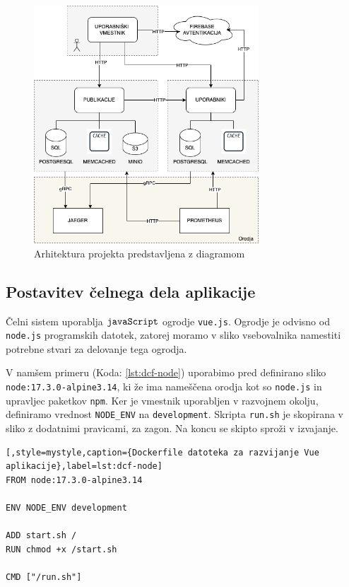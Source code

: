 \documentclass[a4paper, 12pt]{book}
\begin{document}
\begin{figure}[h]
\begin{center}
\includegraphics[width=0.75\textwidth]{slike/arch-done.png}
\end{center}
\caption{ Arhitektura projekta predstavljena z diagramom }
\label{final-arch}
\end{figure}

\subsection{Postavitev čelnega dela aplikacije}
Čelni sistem uporablja $\verb=javaScript=$ ogrodje \verb=vue.js=. Ogrodje je odvisno od \verb=node.js= programskih datotek, zatorej moramo v sliko vsebovalnika namestiti potrebne stvari za delovanje tega ogrodja. 

V namšem primeru (Koda: \ref{lst:dcf-node}) uporabimo pred definirano sliko \\ \texttt{node:17.3.0-alpine3.14}, ki že ima nameščena orodja kot so \texttt{node.js} in upravljec paketkov \texttt{npm}. Ker je vmestnik uporabljen v razvojnem okolju, definiramo vrednost \texttt{NODE\_ENV} na \texttt{development}. Skripta \texttt{run.sh} je skopirana v sliko z dodatnimi pravicami, za zagon. Na koncu se skipto sproži v izvajanje.

\begin{lstlisting}[,style=mystyle,caption={Dockerfile datoteka za razvijanje Vue aplikacije},label=lst:dcf-node]
FROM node:17.3.0-alpine3.14

ENV NODE_ENV development

ADD start.sh /
RUN chmod +x /start.sh

CMD ["/run.sh"]
\end{lstlisting}
\end{document}
